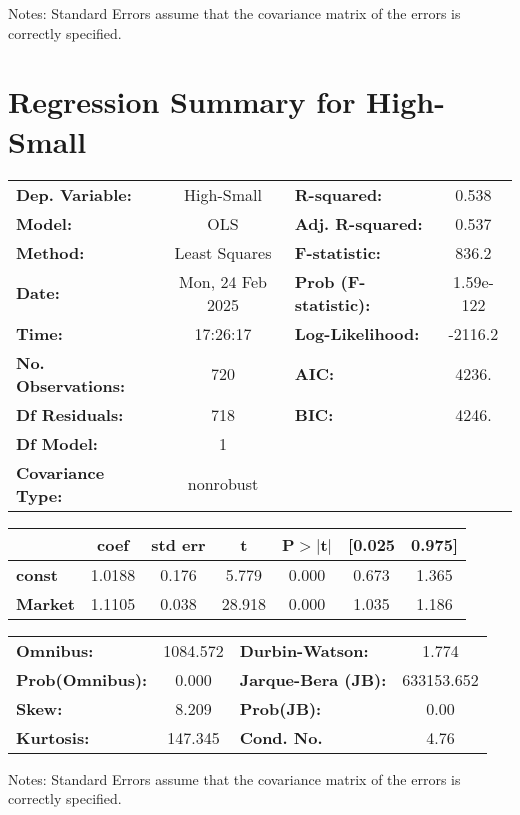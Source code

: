 \documentclass{article}
\begin{document}
Notes: \newline
 [1] Standard Errors assume that the covariance matrix of the errors is correctly specified.
\newpage
\section*{Regression Summary for High-Small}
\begin{center}
\begin{tabular}{lclc}
\toprule
\textbf{Dep. Variable:}    &    High-Small    & \textbf{  R-squared:         } &     0.538   \\
\textbf{Model:}            &       OLS        & \textbf{  Adj. R-squared:    } &     0.537   \\
\textbf{Method:}           &  Least Squares   & \textbf{  F-statistic:       } &     836.2   \\
\textbf{Date:}             & Mon, 24 Feb 2025 & \textbf{  Prob (F-statistic):} & 1.59e-122   \\
\textbf{Time:}             &     17:26:17     & \textbf{  Log-Likelihood:    } &   -2116.2   \\
\textbf{No. Observations:} &         720      & \textbf{  AIC:               } &     4236.   \\
\textbf{Df Residuals:}     &         718      & \textbf{  BIC:               } &     4246.   \\
\textbf{Df Model:}         &           1      & \textbf{                     } &             \\
\textbf{Covariance Type:}  &    nonrobust     & \textbf{                     } &             \\
\bottomrule
\end{tabular}
\begin{tabular}{lcccccc}
                & \textbf{coef} & \textbf{std err} & \textbf{t} & \textbf{P$> |$t$|$} & \textbf{[0.025} & \textbf{0.975]}  \\
\midrule
\textbf{const}  &       1.0188  &        0.176     &     5.779  &         0.000        &        0.673    &        1.365     \\
\textbf{Market} &       1.1105  &        0.038     &    28.918  &         0.000        &        1.035    &        1.186     \\
\bottomrule
\end{tabular}
\begin{tabular}{lclc}
\textbf{Omnibus:}       & 1084.572 & \textbf{  Durbin-Watson:     } &     1.774   \\
\textbf{Prob(Omnibus):} &   0.000  & \textbf{  Jarque-Bera (JB):  } & 633153.652  \\
\textbf{Skew:}          &   8.209  & \textbf{  Prob(JB):          } &      0.00   \\
\textbf{Kurtosis:}      & 147.345  & \textbf{  Cond. No.          } &      4.76   \\
\bottomrule
\end{tabular}
\end{center}

Notes: \newline
 [1] Standard Errors assume that the covariance matrix of the errors is correctly specified.
\end{document}
